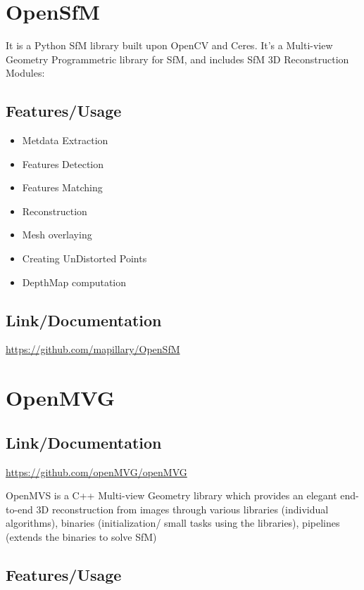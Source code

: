 \documentclass{article}[11pt]
\begin{document}
\section{OpenSfM}


It is a Python SfM library built upon OpenCV and Ceres. It's a Multi-view Geometry Programmetric library for SfM, and includes SfM 3D Reconstruction Modules:


\subsection{Features/Usage}

\begin{itemize}
    \begin{itemize}
        \item Metdata Extraction 
        \item Features Detection
        \item Features Matching
        \item Reconstruction
        \item Mesh overlaying
        \item Creating UnDistorted Points
        \item DepthMap computation
    \end{itemize}
\end{itemize}

\subsection{Link/Documentation}
\url{https://github.com/mapillary/OpenSfM}


\section{OpenMVG}

\subsection{Link/Documentation}
\url{https://github.com/openMVG/openMVG}

OpenMVS is a C++ Multi-view Geometry library which provides an elegant end-to-end 3D reconstruction from images through various libraries (individual algorithms), binaries (initialization/ small tasks using the libraries), pipelines (extends the binaries to solve SfM)

\subsection{Features/Usage}
\end{document}
